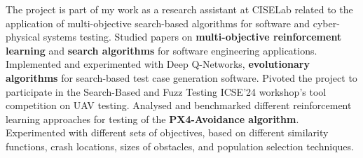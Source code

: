     \vspace{6pt}
    \small{\newline{} The project is part of my work as a research assistant at CISELab related to the application of multi-objective search-based algorithms for software and cyber-physical systems testing.}
    \vspace{-4pt}
        \resumeItemListStart
            \subItemOfItem
            {Studied papers on \textbf{multi-objective reinforcement learning} and \textbf{search algorithms} for software engineering applications.}
            \subItemOfItem
            {Implemented and experimented with Deep Q-Networks, \textbf{evolutionary algorithms} for search-based test case generation software.}
            \subItemOfItem
            {Pivoted the project to participate in the Search-Based and Fuzz Testing ICSE’24 workshop's tool competition on UAV testing.}
            \subItemOfItem
            {Analysed and benchmarked different reinforcement learning approaches for testing of the \textbf{PX4-Avoidance algorithm}.}
            \subItemOfItem
            {Experimented with different sets of objectives, based on different similarity functions, crash locations, sizes of obstacles, and population selection techniques.}          
        \resumeItemListEnd
